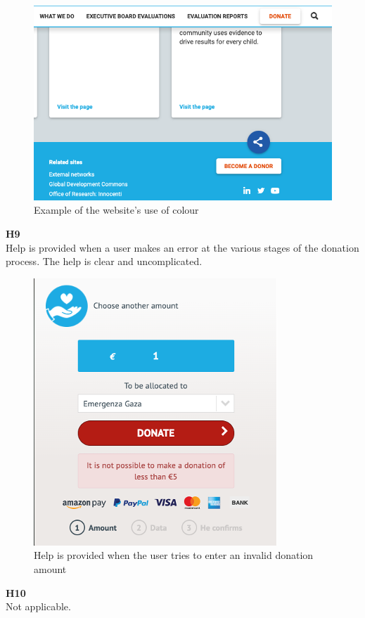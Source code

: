 \begin{description}
    \newpage
    \begin{figure}[h]
        \centering
        \includegraphics[scale=1.0]{Resources/Harry/Harry_H8.png}
        \caption{Example of the website's use of colour}
    \end{figure}
    \item {\textbf{H9} \color{unicefGray}{Help users recognize, diagnose and recover from errors}}\\
    Help is provided when a user makes an error at the various stages of the donation process. The help is clear and uncomplicated.
    \begin{figure}[h]
        \centering
        \includegraphics[scale=1.0]{Resources/Harry/Harry_H9.png}
        \caption{Help is provided when the user tries to enter an invalid donation amount}
    \end{figure}
    \item {\textbf{H10} \color{unicefGray}{Help and documentation}}\\
    Not applicable.
\end{description}
\newpage
